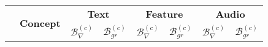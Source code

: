\begin{table}[H]
    \begin{tabular}{|c|c|cc|cc|cc|}
        \hline
        \multirow{2}{*}{} & \multirow{2}{*}{\textbf{Concept}} & \multicolumn{2}{c|}{\textbf{Text}}                         & \multicolumn{2}{c|}{\textbf{Feature}} & \multicolumn{2}{c|}{\textbf{Audio}}                                                                                                                                                                     \\ \cline{3-8}
                                                                                 &                                   & \multicolumn{1}{c|}{\textbf{$\mathcal{B}^{(c)}_{\nabla}$}} & \textbf{$\mathcal{B}^{(c)}_{gr}$}     & \multicolumn{1}{c|}{\textbf{$\mathcal{B}^{(c)}_{\nabla}$}} & \textbf{$\mathcal{B}^{(c)}_{gr}$}     & \multicolumn{1}{c|}{\textbf{$\mathcal{B}^{(c)}_{\nabla}$}} & \textbf{$\mathcal{B}^{(c)}_{gr}$}     \\ \hline


\end{tabular}
\end{table}
